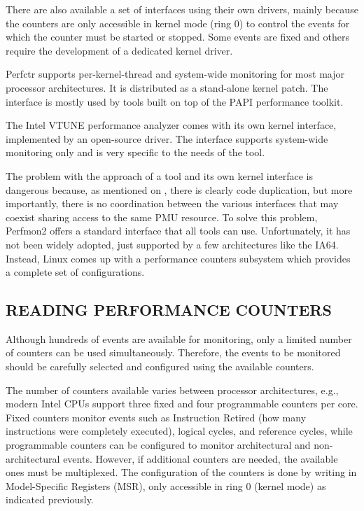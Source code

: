 There are also available a set of interfaces using their own drivers, mainly because the counters are only accessible in kernel mode (ring 0) to control the events for which the counter must be started or stopped. Some events are fixed and others require the development of a dedicated kernel driver. 

Perfctr \cite{MikaelPettersson.TheInterface.} supports per-kernel-thread and system-wide monitoring for most major processor architectures. It is distributed as a stand-alone kernel patch. The interface is mostly used by tools built on top of the PAPI performance toolkit. 

The Intel VTUNE \cite{IntelCorp.TheAnalyzer.} performance analyzer comes with its own kernel interface, implemented by an open-source driver. The interface supports system-wide monitoring only and is very specific to the needs of the tool.

The problem with the approach of a tool and its own kernel interface is dangerous because, as mentioned on \cite{EranianPerfmon2Interface}, there is clearly code duplication, but more importantly, there is no coordination between the various interfaces that may coexist sharing access to the same PMU resource. To solve this problem, Perfmon2 \cite{Eranian2005TheSpecification} offers a standard interface that all tools can use. Unfortunately, it has not been widely adopted, just supported by a few architectures like the IA64. Instead, Linux comes up with a performance counters subsystem which provides a complete set of configurations.


\subsection{READING PERFORMANCE COUNTERS}

Although hundreds of events are available for monitoring, only a limited number of counters can be used simultaneously.
Therefore, the events to be monitored should be carefully selected and configured using the available counters.

The number of counters available varies between processor architectures, e.g., modern Intel CPUs \cite{Intel2013IntelGuide} support three fixed and four programmable counters per core. Fixed counters monitor events such as Instruction Retired (how many instructions were completely executed), logical cycles, and reference cycles, while programmable counters can be configured to monitor architectural and non-architectural events. 
However, if additional counters are needed, the available ones must be multiplexed.
The configuration of the counters is done by writing in Model-Specific Registers (MSR), only accessible in ring 0 (kernel mode) as indicated previously. 


